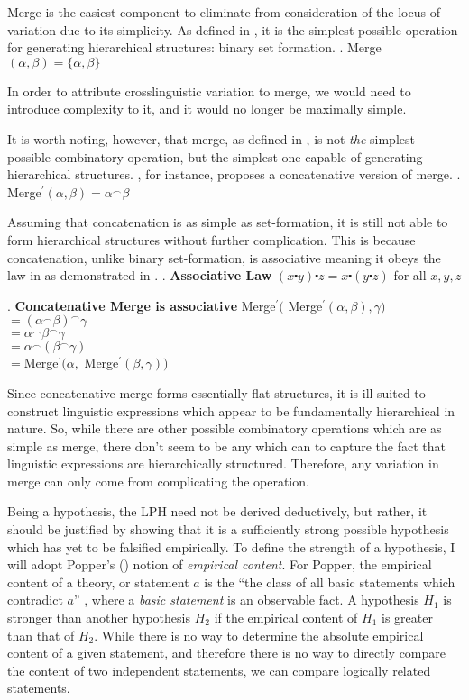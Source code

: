\documentclass[MilwayThesis]{subfiles}
\begin{document}
Merge is the easiest component to eliminate from consideration of the locus of variation due to its simplicity.
As defined in \Next, it is the simplest possible operation for generating hierarchical structures: binary set formation.
\ex. Merge$(\alpha, \beta) = \{ \alpha, \beta\}$

In order to attribute crosslinguistic variation to merge, we would need to introduce complexity to it, and it would no longer be maximally simple.

It is worth noting, however, that merge, as defined in \Last, is not \textit{the} simplest possible combinatory operation, but the simplest one capable of generating hierarchical structures.
\textcite{hornstein2009theory}, for instance, proposes a concatenative version of merge.
\ex. Merge$^\prime(\alpha, \beta) = \alpha^\frown\beta$

Assuming that concatenation is as simple as set-formation, it is still not able to form hierarchical structures without further complication.
This is because concatenation, unlike binary set-formation, is associative meaning it obeys the law in \Next as demonstrated in \NNext.
\ex. \textbf{Associative Law}
$(x \centerdot y) \centerdot z = x \centerdot (y \centerdot z)$ for all $x,y,z$

\ex. \textbf{Concatenative Merge is associative}
Merge$^\prime($ Merge$^\prime(\alpha, \beta), \gamma)$\\
$= (\alpha^\frown\beta)^\frown\gamma$\\
$= \alpha^\frown\beta^\frown\gamma$\\
$= \alpha^\frown(\beta^\frown\gamma)$\\
$= $Merge$^\prime(\alpha, $ Merge$^\prime(\beta, \gamma))$

Since concatenative merge forms essentially flat structures, it is ill-suited to construct linguistic expressions which appear to be fundamentally hierarchical in nature.
So, while there are other possible combinatory operations which are as simple as merge, there don't seem to be any which can to capture the fact that linguistic expressions are hierarchically structured.
Therefore, any variation in merge can only come from complicating the operation.

Being a hypothesis, the LPH need not be derived deductively, but rather, it should be justified by showing that it is a sufficiently strong possible hypothesis which has yet to be falsified empirically.
To define the strength of a hypothesis, I will adopt Popper's (\citeyear{popper1959logic,popper2014conjectures}) notion of \textit{empirical content}.
For Popper, the empirical content of a theory, or statement $a$ is the ``the class of all basic statements which contradict $a$'' \parencite[315]{popper2014conjectures}, where a \textit{basic statement} is an observable fact.
A hypothesis $H_1$ is stronger than another hypothesis $H_2$ if the empirical content of $H_1$ is greater than that of $H_2$.
While there is no way to determine the absolute empirical content of a given statement, and therefore there is no way to directly compare the content of two independent statements, we can compare logically related statements.
\end{document}
